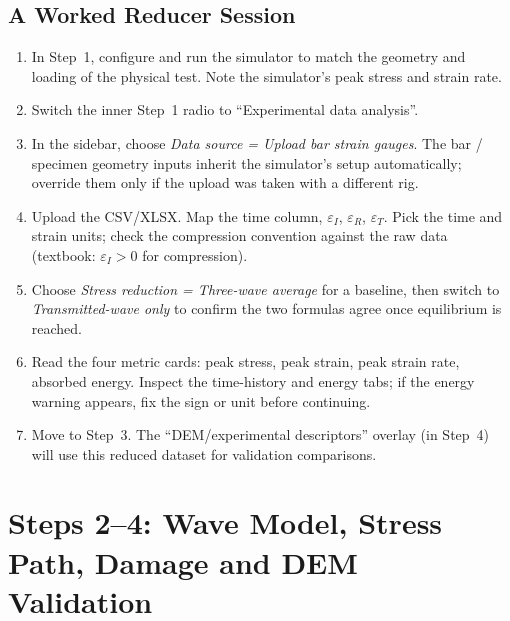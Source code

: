 \documentclass[11pt,a4paper]{article}
\newcommand{\eps}{\varepsilon}
\begin{document}
\subsection{A Worked Reducer Session}

\begin{stepbox}
\begin{enumerate}[leftmargin=*, itemsep=3pt]
  \item In Step~1, configure and run the simulator to match the geometry and
        loading of the physical test. Note the simulator's peak stress and
        strain rate.
  \item Switch the inner Step~1 radio to ``Experimental data analysis''.
  \item In the sidebar, choose \emph{Data source = Upload bar strain gauges}.
        The bar / specimen geometry inputs inherit the simulator's setup
        automatically; override them only if the upload was taken with a
        different rig.
  \item Upload the CSV/XLSX. Map the time column, $\eps_I$, $\eps_R$,
        $\eps_T$. Pick the time and strain units; check the compression
        convention against the raw data (textbook: $\eps_I > 0$ for
        compression).
  \item Choose \emph{Stress reduction = Three-wave average} for a baseline,
        then switch to \emph{Transmitted-wave only} to confirm the two
        formulas agree once equilibrium is reached.
  \item Read the four metric cards: peak stress, peak strain, peak strain
        rate, absorbed energy. Inspect the time-history and energy tabs; if
        the energy warning appears, fix the sign or unit before continuing.
  \item Move to Step~3. The ``DEM/experimental descriptors'' overlay (in
        Step~4) will use this reduced dataset for validation comparisons.
\end{enumerate}
\end{stepbox}

\newpage
\section{Steps 2--4: Wave Model, Stress Path, Damage and DEM Validation}
\label{sec:wave_damage}
\end{document}
